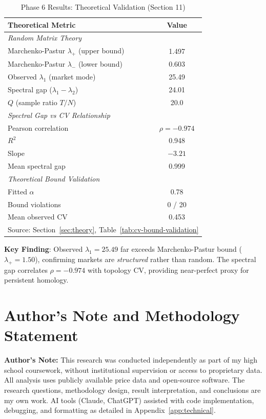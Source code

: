 \documentclass[12pt,letterpaper]{article}
\begin{document}
\begin{table}[H]
\centering
\caption{Phase 6 Results: Theoretical Validation (Section 11)}
\label{tab:phase6}
\begin{tabular}{@{}lc@{}}
\toprule
\textbf{Theoretical Metric} & \textbf{Value} \\
\midrule
\multicolumn{2}{l}{\textit{Random Matrix Theory}} \\
\quad Marchenko-Pastur $\lambda_+$ (upper bound) & 1.497 \\
\quad Marchenko-Pastur $\lambda_-$ (lower bound) & 0.603 \\
\quad Observed $\lambda_1$ (market mode) & 25.49 \\
\quad Spectral gap ($\lambda_1 - \lambda_2$) & 24.01 \\
\quad $Q$ (sample ratio $T/N$) & 20.0 \\
\midrule
\multicolumn{2}{l}{\textit{Spectral Gap vs CV Relationship}} \\
\quad Pearson correlation & $\rho = -0.974$ \\
\quad $R^2$ & 0.948 \\
\quad Slope & $-3.21$ \\
\quad Mean spectral gap & 0.999 \\
\midrule
\multicolumn{2}{l}{\textit{Theoretical Bound Validation}} \\
\quad Fitted $\alpha$ & 0.78 \\
\quad Bound violations & 0 / 20 \\
\quad Mean observed CV & 0.453 \\
\bottomrule
\multicolumn{2}{l}{\footnotesize Source: Section~\ref{sec:theory}, Table~\ref{tab:cv-bound-validation}}
\end{tabular}
\end{table}

\textbf{Key Finding}: Observed $\lambda_1 = 25.49$ far exceeds Marchenko-Pastur bound ($\lambda_+ = 1.50$), confirming markets are \textit{structured} rather than random. The spectral gap correlates $\rho = -0.974$ with topology CV, providing near-perfect proxy for persistent homology.

\section{Author's Note and Methodology Statement}
\label{app:author-note}

\textbf{Author's Note:} This research was conducted independently as part of my high school coursework, without institutional supervision or access to proprietary data. All analysis uses publicly available price data and open-source software. The research questions, methodology design, result interpretation, and conclusions are my own work. AI tools (Claude, ChatGPT) assisted with code implementation, debugging, and formatting as detailed in Appendix~\ref{app:technical}.
\end{document}
